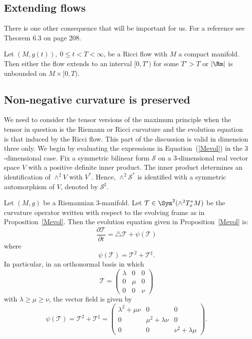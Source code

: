 \subsection{Extending flows}

There is one other consequence that will be important for us. For a
reference see \cite{ChowLuNi} Theorem 6.3 on page 208.


\begin{proposition}
\label{prop:ricci-flow-extension-criterion}
\label{flowextend}
Let $(M,g(t)),\ 0\le t<T<\infty$, be a Ricci flow with $M$ a compact manifold.
Then either the flow extends to an interval $[0,T')$ for some $T'>T$ or $|\Rm|$ is unbounded on $M\times[0,T)$.
\end{proposition}






\subsection{Non-negative curvature is preserved}

We need to consider the tensor versions of the maximum principle
when the tensor in question is the Riemann or Ricci curvature and
the evolution equation is that induced by the Ricci flow. This part
of the discussion is valid in dimension three only. We begin by
evaluating the expressions in Equation~(\ref{Mevol}) in the
$3$-dimensional case. Fix a symmetric bilinear form ${\mathcal S}$
on a $3$-dimensional real vector space $V$ with a positive definite
inner product. The inner product determines an identification of
$\wedge^2V$ with $V^*$. Hence, $\wedge^2{\mathcal S}^*$ is
identified with a symmetric automorphism of $V$,  denoted by
${\mathcal S}^\sharp$.

\begin{lemma}
\label{lem:curvature-operator-ode-dimension-three}
\label{quad}
Let $(M,g)$ be a Riemannian $3$-manifold. Let ${\mathcal T}\in \Sym^2(\wedge^2T_x^*M)$ be the curvature operator written with
respect to the evolving frame as in Proposition~\ref{Mevol}. Then
the evolution equation given in Proposition~\ref{Mevol} is:
$$\frac{\partial {\mathcal T}}{\partial t}=\triangle {\mathcal T}+\psi({\mathcal T})$$
where
$$\psi({\mathcal T})={\mathcal T}^2+{\mathcal T}^\sharp.$$
In particular, in an orthonormal basis in which
$${\mathcal T}=\begin{pmatrix} \lambda & 0 & 0 \\ 0 & \mu & 0 \\ 0 &
0  & \nu\end{pmatrix}$$ with $\lambda\ge \mu\ge \nu$, the vector
field is given by
$$\psi({\mathcal T})={\mathcal T}^2+{\mathcal T}^\sharp=\begin{pmatrix}
\lambda^2+\mu\nu & 0 & 0 \\ 0 & \mu^2+\lambda\nu & 0 \\ 0 & 0 &
\nu^2+\lambda\mu\end{pmatrix}.$$
\end{lemma}

